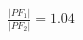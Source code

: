 \documentclass[preview]{standalone}
\begin{document}
\begin{align*}
\frac{|PF_1|}{|PF_2|} = 1.04
\end{align*}
\end{document}
